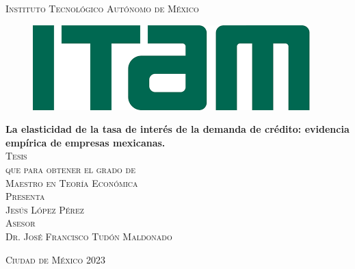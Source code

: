 \documentclass[11pt, oneside]{book}
\begin{document}


\begin{titlepage}
\begin{center}

\textsc{\Large Instituto Tecnológico Autónomo de México}\\[2em]

\begin{figure}[h]
\begin{center}
\includegraphics[scale=0.50]{itam_logo.png}
\end{center}
\end{figure}


\textbf{\LARGE La elasticidad de la tasa de interés de la demanda de crédito: evidencia empírica de empresas mexicanas.}\\[2em]

\textsc{\large Tesis}\\[1em]

\textsc{\large que para obtener el grado de}\\[1em]

\textsc{\LARGE Maestro en Teoría Económica }\\[1em]

\textsc{\large Presenta}\\[1em]

\textsc{\LARGE Jesús López Pérez}\\[1em]

\textsc{\large Asesor}\\[1em]

\textsc{\LARGE Dr. José Francisco Tudón Maldonado}\\[2em]


\end{center}

\vspace*{\fill}
\textsc{Ciudad de México \hspace*{\fill} 2023}

\end{titlepage}
\end{document}
